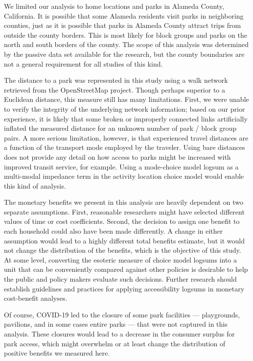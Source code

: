 \documentclass[3p, authoryear, review]{elsarticle} %
\begin{document}
We limited our analysis to home locations and parks in Alameda County,
California. It is possible that some Alameda residents visit parks in
neighboring counties, just as it is possible that parks in Alameda County
attract trips from outside the county borders. This is most likely for block
groups and parks on the north and south borders of the county. The scope of this
analysis was determined by the passive data set available for the research, but
the county boundaries are not a general requirement for all studies of this
kind.

The distance to a park was represented in this study using a walk network
retrieved from the OpenStreetMap project. Though perhaps superior to a Euclidean
distance, this measure still has many limitations. First, we were unable to
verify the integrity of the underlying network information; based on our prior
experience, it is likely that some broken or improperly connected links
artificially inflated the measured distance for an unknown number of park /
block group pairs. A more serious limitation, however, is that experienced
travel distances are a function of the transport mode employed by the traveler.
Using bare distances does not provide any detail on how access to parks might be
increased with improved transit service, for example. Using a mode-choice model
logsum as a multi-modal impedance term in the activity location choice model
would enable this kind of analysis.

The monetary benefits we present in this analysis are heavily dependent on
two separate assumptions. First, reasonable researchers might have selected
different values of time or cost coefficients. Second, the decision to assign
one benefit to each household could also have been made
differently. A change in either assumption would lead to a highly different
total benefits estimate, but it would not change the distribution of the
benefits, which is the objective of this study. At some level, converting the
esoteric measure of choice model logsums into a unit that can be conveniently
compared against other policies is desirable to help the public and policy
makers evaluate such decisions. Further research should establish guidelines and
practices for applying accessibility logsums in monetary cost-benefit analyses.

Of course, COVID-19 led to the closure of some park facilities --- playgrounds,
pavilions, and in some cases entire parks --- that were not captured in this
analysis. These closures would lead to a decrease in the consumer surplus for
park access, which might overwhelm or at least change the distribution of
positive benefits we measured here.
\end{document}

